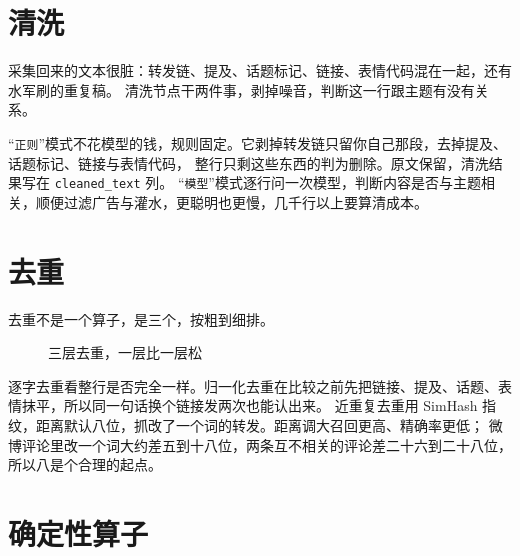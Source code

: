 \section{清洗}

采集回来的文本很脏：转发链、提及、话题标记、链接、表情代码混在一起，还有水军刷的重复稿。
清洗节点干两件事，剥掉噪音，判断这一行跟主题有没有关系。

“\texttt{正则}”模式不花模型的钱，规则固定。它剥掉转发链只留你自己那段，去掉提及、话题标记、链接与表情代码，
整行只剩这些东西的判为删除。原文保留，清洗结果写在 \texttt{cleaned\_text} 列。
“\texttt{模型}”模式逐行问一次模型，判断内容是否与主题相关，顺便过滤广告与灌水，更聪明也更慢，几千行以上要算清成本。

\section{去重}

去重不是一个算子，是三个，按粗到细排。

\begin{figure}[H]\centering
{}
\caption{三层去重，一层比一层松}
\label{fig:dedupe}
\end{figure}

逐字去重看整行是否完全一样。归一化去重在比较之前先把链接、提及、话题、表情抹平，所以同一句话换个链接发两次也能认出来。
近重复去重用 SimHash 指纹，距离默认八位，抓改了一个词的转发。距离调大召回更高、精确率更低；
微博评论里改一个词大约差五到十八位，两条互不相关的评论差二十六到二十八位，所以八是个合理的起点。

\section{确定性算子}

